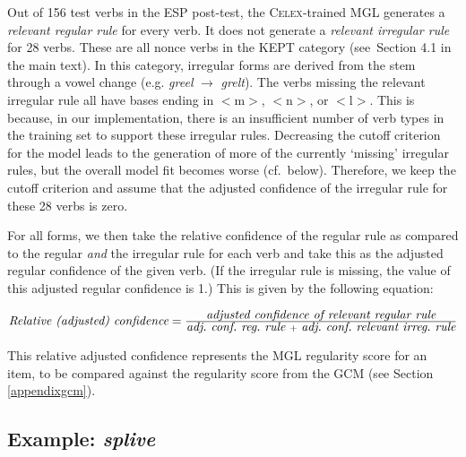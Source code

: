 \documentclass[12pt]{article}
\begin{document}
Out of 156 test verbs in the ESP post-test, the \textsc{Celex}-trained MGL generates a {\em relevant regular rule} for every verb. It does not generate a {\em relevant irregular rule} for 28 verbs. These are all nonce verbs in the \textsc{KEPT} category (see\ Section 4.1 in the main text). In this category, irregular forms are derived from the stem through a vowel change (e.g. {\em greel} $\rightarrow{}$ {\em grelt}). The verbs missing the relevant irregular rule all have bases ending in $<$m$>$, $<$n$>$, or $<$l$>$. This is because, in our implementation, there is an insufficient number of verb types in the training set to support these irregular rules. Decreasing the cutoff criterion for the model leads to the generation of more of the currently `missing' irregular rules, but the overall model fit becomes worse (cf.\ below). Therefore, we keep the cutoff criterion and assume that the adjusted confidence of the irregular rule for these 28 verbs is zero. 

For all forms, we then take the relative confidence of the regular rule as compared to the regular {\em and} the irregular rule for each verb and take this as the adjusted regular confidence of the given verb. (If the irregular rule is missing, the value of this adjusted regular confidence is 1.) This is given by the following equation:

\vspace{1cm}
$\mbox{\it Relative (adjusted) confidence} = \frac{\mbox{\it  adjusted confidence of relevant regular rule}} {\mbox{\it  adj.\ conf.\ reg.\ rule } + \mbox{ \it adj.\ conf.\ relevant irreg.\ rule}}$
\vspace{1cm}

This relative adjusted confidence represents the MGL regularity score for an item, to be compared against the regularity score from the GCM (see Section \ref{appendixgcm}).  

\subsection{Example: {\em splive}}
\end{document}
